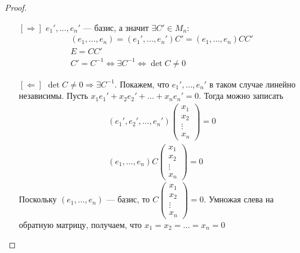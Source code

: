 \begin{proof} \ 
\begin{itemize}
\item[{$[\Rightarrow]$}] $e_1', \ldots, e_n'$ --- базис, а значит $\exists C' \in M_n \colon$
\begin{gather*}
\left(e_1, \ldots, e_n\right) = \left(e_1', \ldots, e_n'\right)C' = \left(e_1, \ldots, e_n\right)CC'\\
E = CC'\\
C' = C^{-1} \Leftrightarrow \exists C^{-1} \Leftrightarrow \det{C} \neq 0
\end{gather*}
\item[{$[\Leftarrow]$}] $\det C \neq 0 \Rightarrow \exists C^{-1}$. Покажем, что $e_1', \ldots, e_n'$ в таком случае линейно независимы. Пусть $x_1e_1' + x_2e_2' + \ldots + x_ne_n' = 0$. Тогда можно записать
\begin{gather*}
\left(e_1', e_2', \ldots, e_n'\right) 
\begin{pmatrix}
    x_1\\
    x_2\\
    \vdots\\
    x_n
\end{pmatrix} = 0\\
\left(e_1, \ldots, e_n\right)C\begin{pmatrix}
    x_1\\
    x_2\\
    \vdots\\
    x_n
\end{pmatrix} = 0
\end{gather*}
Поскольку $\left(e_1, \ldots, e_n\right)$ --- базис, то $C \begin{pmatrix}
    x_1\\
    x_2\\
    \vdots\\
    x_n
\end{pmatrix} = 0$. Умножая слева на обратную матрицу, получаем, что $x_1 = x_2 = \ldots = x_n = 0$
\end{itemize}
\end{proof}


